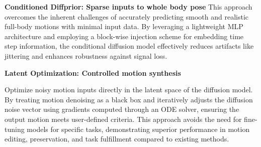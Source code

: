 \documentclass{egpubl}
\begin{document}
\textbf{Conditioned Diffprior: Sparse inputs to whole body pose}
This approach overcomes the inherent challenges of accurately predicting smooth and realistic full-body motions with minimal input data. By leveraging a lightweight MLP architecture and employing a block-wise injection scheme for embedding time step information, the conditional diffusion model effectively reduces artifacts like jittering and enhances robustness against signal loss.

\textbf{Latent Optimization: Controlled motion synthesis}

Optimize noisy motion inputs directly in the latent space of the diffusion model. By treating motion denoising as a black box and iteratively adjusts the diffusion noise vector using gradients computed through an ODE solver, ensuring the output motion meets user-defined criteria. This approach avoids the need for fine-tuning models for specific tasks, demonstrating superior performance in motion editing, preservation, and task fulfillment compared to existing methods.
\end{document}
